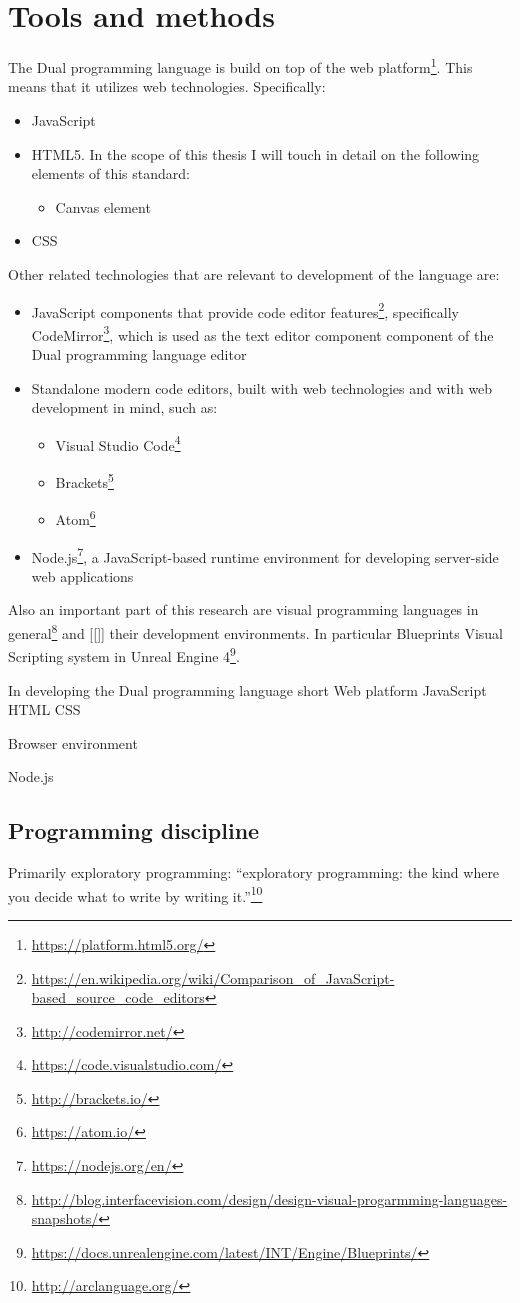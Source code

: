 \chapter{Tools and methods}\label{chap:tools}
The Dual programming language is build on top of the web platform\footnote{\url{https://platform.html5.org/}}. This means that it utilizes web technologies. Specifically:
\begin{itemize}
    \item JavaScript
    \item HTML5. In the scope of this thesis I will touch in detail on the following elements of this standard:
    \begin{itemize}
        \item Canvas element
    \end{itemize}
    \item CSS
\end{itemize}

Other related technologies that are relevant to development of the language are:
\begin{itemize}
    \item JavaScript components that provide code editor features\footnote{\url{https://en.wikipedia.org/wiki/Comparison_of_JavaScript-based_source_code_editors}}, specifically CodeMirror\footnote{\url{http://codemirror.net/}}, which is used as the text editor component component of the Dual programming language editor
    \item Standalone modern code editors, built with web technologies and with web development in mind, such as:
    \begin{itemize}
        \item Visual Studio Code\footnote{\url{https://code.visualstudio.com/}}
        \item Brackets\footnote{\url{http://brackets.io/}}
        \item Atom\footnote{\url{https://atom.io/}}
    \end{itemize}
    \item Node.js\footnote{\url{https://nodejs.org/en/}}, a JavaScript-based runtime environment for developing server-side web applications
\end{itemize}

Also an important part of this research are visual programming languages in general\footnote{\url{
http://blog.interfacevision.com/design/design-visual-progarmming-languages-snapshots/}} and [[]] their development environments.
In particular Blueprints Visual Scripting system in Unreal Engine 4\footnote{\url{https://docs.unrealengine.com/latest/INT/Engine/Blueprints/}}.

In developing the Dual programming language 
short
Web platform
JavaScript
HTML
CSS

Browser environment

Node.js

\section{Programming discipline}
Primarily exploratory programming:
``exploratory programming: the kind where you decide what to write by writing it.''\footnote{\url{http://arclanguage.org/}}